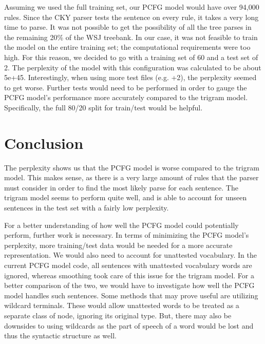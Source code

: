 \documentclass{article}
\begin{document}
Assuming we used the full training set, our PCFG model would have over 94,000 rules. Since the CKY parser tests the sentence on every rule, it takes a very long time to parse. It was not possible to get the possibility of all the tree parses in the remaining 20\% of the WSJ treebank. In our case, it was not feasible to train the model on the entire training set; the computational requirements were too high. For this reason, we decided to go with a training set of 60 and a test set of 2. The perplexity of the model with this configuration was calculated to be about 5e+45. Interestingly, when using more test files (e.g. +2), the perplexity seemed to get worse. Further tests would need to be performed in order to gauge the PCFG model's performance more accurately compared to the trigram model. Specifically, the full 80/20 split for train/test would be helpful.

\section{Conclusion}
The perplexity shows us that the PCFG model is worse compared to the trigram model. This makes sense, as there is a very large amount of rules that the parser must consider in order to find the most likely parse for each sentence. The trigram model seems to perform quite well, and is able to account for unseen sentences in the test set with a fairly low perplexity.

For a better understanding of how well the PCFG model could potentially perform, further work is necessary. In terms of minimizing the PCFG model's perplexity, more training/test data would be needed for a more accurate representation. We would also need to account for unattested vocabulary. In the current PCFG model code, all sentences with unattested vocabulary words are ignored, whereas smoothing took care of this issue for the trigram model. For a better comparison of the two, we would have to investigate how well the PCFG model handles such sentences. Some methods that may prove useful are utilizing wildcard terminals. These would allow unattested words to be treated as a separate class of node, ignoring its original type. But, there may also be downsides to using wildcards as the part of speech of a word would be lost and thus the syntactic structure as well.

\printbibliography{}
\end{document}
